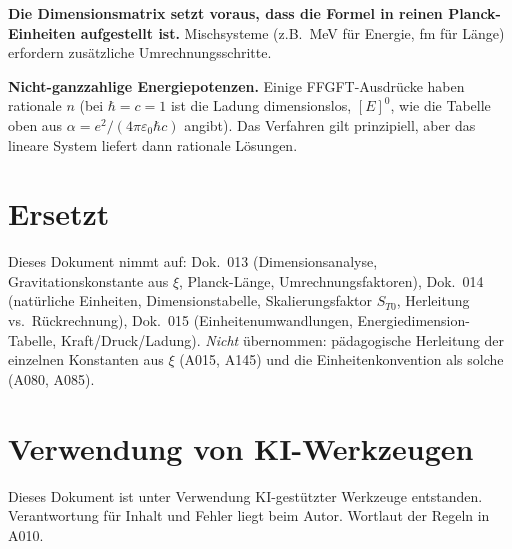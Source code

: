 \textbf{Die Dimensionsmatrix setzt voraus, dass die Formel in reinen
Planck-Einheiten aufgestellt ist.} Mischsysteme (z.B.\ MeV für Energie, fm
für Länge) erfordern zusätzliche Umrechnungsschritte.

\textbf{Nicht-ganzzahlige Energiepotenzen.} Einige FFGFT-Ausdrücke haben
rationale $n$ (bei $\hbar=c=1$ ist die Ladung dimensionslos, $[E]^0$, wie die Tabelle oben aus $\alpha=e^2/(4\pi\varepsilon_0\hbar c)$ angibt). Das Verfahren gilt prinzipiell,
aber das lineare System liefert dann rationale Lösungen.

\section{Ersetzt}

Dieses Dokument nimmt auf: Dok.~013 (Dimensionsanalyse, Gravitationskonstante
aus $\xi$, Planck-Länge, Umrechnungsfaktoren), Dok.~014 (natürliche Einheiten,
Dimensionstabelle, Skalierungsfaktor $S_{T0}$, Herleitung vs.\ Rückrechnung),
Dok.~015 (Einheitenumwandlungen, Energiedimension-Tabelle, Kraft/Druck/Ladung).
\emph{Nicht} übernommen: pädagogische Herleitung der einzelnen Konstanten aus
$\xi$ (A015, A145) und die Einheitenkonvention als solche (A080, A085).

\section{Verwendung von KI-Werkzeugen}

Dieses Dokument ist unter Verwendung KI-gestützter Werkzeuge entstanden.
Verantwortung für Inhalt und Fehler liegt beim Autor. Wortlaut der Regeln in A010.
